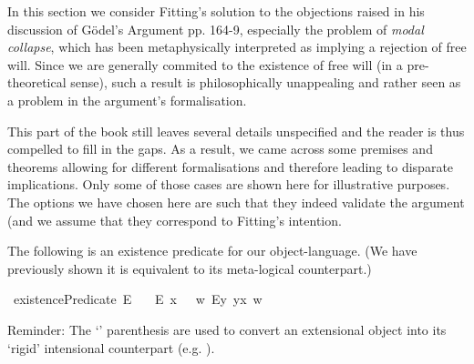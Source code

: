 %
\begin{isabellebody}%
%
%
%
%
%
%
%
%
\isamarkuptrue%
%
\begin{isamarkuptext}%
In this section we consider Fitting's solution to the objections raised in his discussion of G\"odel's Argument pp. 164-9, 
especially the problem of \emph{modal collapse}, which has been metaphysically interpreted as implying a rejection of free will.
Since we are generally commited to the existence of free will (in a pre-theoretical sense), such a result is
philosophically unappealing and rather seen as a problem in the argument's formalisation.%
\end{isamarkuptext}\isamarkuptrue%
%
\begin{isamarkuptext}%
This part of the book still leaves several details unspecified and the reader is thus compelled to fill in the gaps.
As a result, we came across some premises and theorems allowing for different formalisations and therefore leading to disparate implications.
Only some of those cases are shown here for illustrative purposes. The options we have chosen here are such that
they indeed validate the argument (and we assume that they correspond to Fitting's intention.%
\end{isamarkuptext}\isamarkuptrue%
%
\isamarkuptrue%
%
\begin{isamarkuptext}%
The following is an existence predicate for our object-language. (We have previously shown it is equivalent to its
 meta-logical counterpart.)%
\end{isamarkuptext}\isamarkuptrue%
\isamarkupfalse%
\ existencePredicate{\isacharcolon}{\isacharcolon}{\isachardoublequoteopen}{\isasymup}{\isasymlangle}{\isasymzero}{\isasymrangle}{\isachardoublequoteclose}\ {\isacharparenleft}{\isachardoublequoteopen}E{\isacharbang}{\isachardoublequoteclose}{\isacharparenright}\ \isanewline
\ \ {\isachardoublequoteopen}E{\isacharbang}\ x\ \ {\isasymequiv}\ {\isacharparenleft}{\isasymlambda}w{\isachardot}\ {\isacharparenleft}\isactrlbold {\isasymexists}\isactrlsup Ey{\isachardot}\ y\isactrlbold {\isasymapprox}x{\isacharparenright}\ w{\isacharparenright}{\isachardoublequoteclose}%
\begin{isamarkuptext}%
Reminder: The `\isa{{\isasymlparr}{\isacharunderscore}{\isasymrparr}}' parenthesis are used to convert an extensional object into its `rigid'
intensional counterpart (e.g. ).%

\end{isamarkuptext}
\end{isabellebody}
